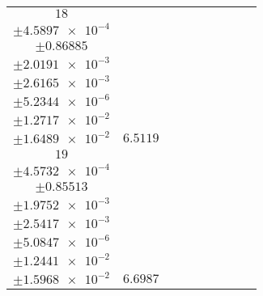 \documentclass[8pt]{article}
\begin{document}
\begin{longtable}[l]{c c c c c c c c c}
$\num{18}$ & \begin{tabular}[c]{@{}c@{}}$\num{3.0239e-2}$ \\ $\pm\num{4.5897e-4}$\end{tabular} & \begin{tabular}[c]{@{}c@{}}$\num{0.42155}$ \\ $\pm\num{0.86885}$\end{tabular} & \begin{tabular}[c]{@{}c@{}}$\num{-0.31913}$ \\ $\pm\num{2.0191e-3}$\end{tabular} & \begin{tabular}[c]{@{}c@{}}$\num{3.6264e+3}$ \\ $\pm\num{2.6165e-3}$\end{tabular} & \begin{tabular}[c]{@{}c@{}}$\num{7.2548}$ \\ $\pm\num{5.2344e-6}$\end{tabular} & \begin{tabular}[c]{@{}c@{}}$\num{0.90128}$ \\ $\pm\num{1.2717e-2}$\end{tabular} & \begin{tabular}[c]{@{}c@{}}$\num{0.91297}$ \\ $\pm\num{1.6489e-2}$\end{tabular} & $\num{6.5119}$\\
$\num{19}$ & \begin{tabular}[c]{@{}c@{}}$\num{3.0526e-2}$ \\ $\pm\num{4.5732e-4}$\end{tabular} & \begin{tabular}[c]{@{}c@{}}$\num{7.4402e-2}$ \\ $\pm\num{0.85513}$\end{tabular} & \begin{tabular}[c]{@{}c@{}}$\num{0.31736}$ \\ $\pm\num{1.9752e-3}$\end{tabular} & \begin{tabular}[c]{@{}c@{}}$\num{3.627e+3}$ \\ $\pm\num{2.5417e-3}$\end{tabular} & \begin{tabular}[c]{@{}c@{}}$\num{7.256}$ \\ $\pm\num{5.0847e-6}$\end{tabular} & \begin{tabular}[c]{@{}c@{}}$\num{0.89796}$ \\ $\pm\num{1.2441e-2}$\end{tabular} & \begin{tabular}[c]{@{}c@{}}$\num{0.88874}$ \\ $\pm\num{1.5968e-2}$\end{tabular} & $\num{6.6987}$\\

\end{longtable}
\end{document}
